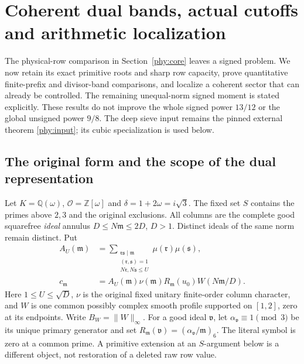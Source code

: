 \section{Coherent dual bands, actual cutoffs and arithmetic localization}
\label{cbk:core}
The physical-row comparison in Section~\ref{phy:core} leaves a signed
problem. We now retain its exact primitive roots and sharp row capacity,
prove quantitative finite-prefix and divisor-band comparisons, and
localize a coherent sector that can already be controlled. The remaining
unequal-norm signed moment is stated explicitly. These results do not
improve the whole signed power $13/12$ or the global unsigned power $9/8$.
The deep sieve input remains the pinned external theorem
\eqref{phy:input}; its cubic specialization is used below.

\subsection{The original form and the scope of the dual representation}
\label{cbk:objects}
Let $K=\mathbb Q(\omega)$, $\mathcal O=\mathbb Z[\omega]$ and
$\delta=1+2\omega=i\sqrt3$. The fixed set $S$ contains the primes above
$2,3$ and the original exclusions. All columns are the complete good
squarefree \emph{ideal} annulus $D\le N\mathfrak m\le2D$, $D>1$.
Distinct ideals of the same norm remain distinct. Put
\begin{equation}\label{cbk:coefficients}
 \begin{aligned}
 A_U(\mathfrak m)
   &=\sum_{\substack{\mathfrak r\mathfrak s\mid\mathfrak m\\
              (\mathfrak r,\mathfrak s)=1\\N\mathfrak r,N\mathfrak s\le U}}
                    \mu(\mathfrak r)\mu(\mathfrak s),\\
 c_{\mathfrak m}
   &=A_U(\mathfrak m)\nu(\mathfrak m)R_{\mathfrak m}(u_0)
                                      W(N\mathfrak m/D).
 \end{aligned}
\end{equation}
Here $1\le U\le\sqrt D$, $\nu$ is the original fixed unitary
finite-order column character, and $W$ is one common possibly complex
smooth profile supported on $[1,2]$, zero at its endpoints.
Write $B_W=\|W\|_\infty$.
For a good ideal $\mathfrak v$, let $\alpha_{\mathfrak v}\equiv1\pmod3$
be its unique primary generator and set
$R_{\mathfrak m}(\mathfrak v)=(\alpha_{\mathfrak v}/\mathfrak m)_6$.
The literal symbol is zero at a common prime. A primitive extension at
an $S$-argument below is a different object, not restoration of a deleted
raw row value.

